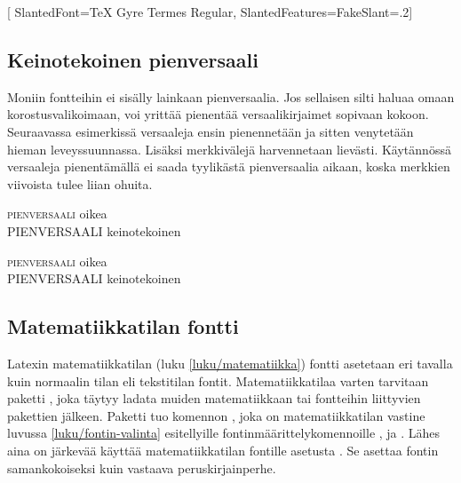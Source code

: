 \begin{koodilohkosis}
\setmainfont{TeX Gyre Termes}[           %
  SlantedFont={TeX Gyre Termes Regular}, %
  SlantedFeatures={FakeSlant=.2}]        %
\end{koodilohkosis}

\subsection{Keinotekoinen pienversaali}
\label{luku/fontit-keinopienversaali}

Moniin fontteihin ei sisälly lainkaan pienversaalia. Jos sellaisen silti
haluaa omaan korostusvalikoimaan, voi yrittää pienentää
versaalikirjaimet sopivaan kokoon. Seuraavassa esimerkissä versaaleja
ensin pienennetään ja sitten venytetään hieman leveyssuunnassa. Lisäksi
merkkivälejä harvennetaan lievästi. Käytännössä versaaleja pienentämällä
ei saada tyylikästä pienversaalia aikaan, koska merkkien viivoista tulee
liian ohuita.

\begin{koodilohkosis}
\textsc{pienversaali} oikea \\
{
  PIENVERSAALI} keinotekoinen
\end{koodilohkosis}

\begin{tulossis}
  \textsc{pienversaali} oikea \\
  {
    PIENVERSAALI} keinotekoinen
\end{tulossis}

\subsection{Matematiikkatilan fontti}
\label{luku/matematiikka-fontit}

Latexin matematiikkatilan (luku \ref{luku/matematiikka}) fontti
asetetaan eri tavalla kuin normaalin tilan eli tekstitilan fontit.
Matematiikkatilaa varten tarvitaan paketti ,
joka täytyy ladata muiden matematiikkaan tai fontteihin liittyvien
pakettien jälkeen. Paketti tuo komennon , joka on
matematiikkatilan vastine luvussa \ref{luku/fontin-valinta} esitellyille
fontinmäärittelykomennoille , 
ja . Lähes aina on järkevää käyttää
matematiikkatilan fontille asetusta .
Se asettaa fontin samankokoiseksi kuin vastaava peruskirjainperhe.

